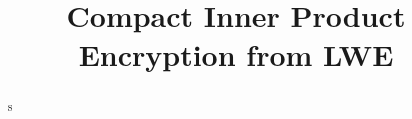 \documentclass[11pt,hidelinks]{article}
\begin{document}
\title{Compact Inner Product Encryption from LWE}%

\author{}
\date{}
\maketitle

\begin{abstract}
s\\

\end{abstract}

\newpage










\newpage





\end{document}
